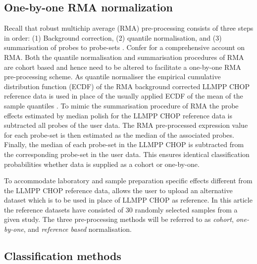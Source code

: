 \documentclass{article}
\begin{document}




\subsection{One-by-one RMA normalization}
Recall that robust multichip average (RMA) pre-processing consists of three steps in order:
(1) Background correction,
(2) quantile normalisation, and
(3) summarisation of probes to probe-sets \citep{Irizarry2003}.
Confer \citet{Bolstad2004} for a comprehensive account on RMA.
Both the quantile normalisation and summarisation procedures of RMA are cohort based and hence need to be altered to facilitate a one-by-one RMA pre-processing scheme.
As quantile normaliser the empirical cumulative distribution function (ECDF) of the RMA background corrected LLMPP CHOP reference data is used in place of the usually applied ECDF of the mean of the sample quantiles \citep{Bolstad2003}.
To mimic the summarisation procedure of RMA \citep{Irizarry2003b} the probe effects estimated by median polish for the LLMPP CHOP reference data is subtracted all probes of the user data.
The RMA pre-processed expression value for each probe-set is then estimated as the median of the associated probes.
Finally, the median of each probe-set in the LLMPP CHOP is subtracted from the corresponding probe-set in the user data.
This ensures identical classification probabilities whether data is supplied as a cohort or one-by-one.

To accommodate laboratory and sample preparation specific effects different from the LLMPP CHOP reference data, \hemaClass{} allows the user to upload an alternative dataset which is to be used in place of LLMPP CHOP as reference.
In this article the reference datasets have consisted of $30$ randomly selected samples from a given study.
The three pre-processing methods will be referred to as \emph{cohort}, \emph{one-by-one}, and \emph{reference based} normalisation.


\subsection{Classification methods}
\end{document}
